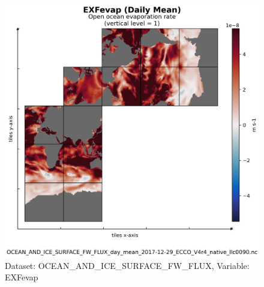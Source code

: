 \begin{figure}[H]
\centering
\includegraphics[scale=0.55]{../images/plots/native_plots/Ocean_and_Sea-Ice_Surface_Freshwater_Fluxes/EXFevap.png}
\caption{Dataset: OCEAN\_AND\_ICE\_SURFACE\_FW\_FLUX, Variable: EXFevap}
\label{tab:table-OCEAN_AND_ICE_SURFACE_FW_FLUX_EXFevap-Plot}
\end{figure}
\newpage
\pagebreak
